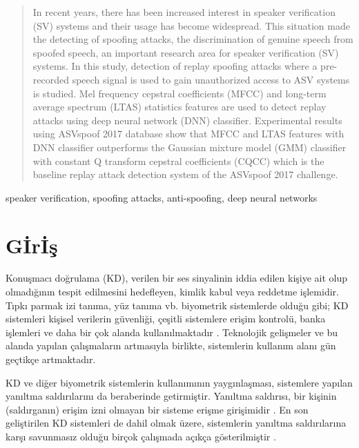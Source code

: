 \documentclass[conference, a4paper]{IEEEtran}
\begin{document}
\begin{abstract}
    In recent years, there has been increased interest in speaker verification (SV) systems and their usage has become
    widespread. This situation made the detecting of spoofing attacks, the discrimination of genuine speech from
    spoofed speech, an important research area for speaker verification (SV) systems. In this study, detection of
    replay spoofing attacks where a pre-recorded speech signal is used to gain unauthorized access to ASV systems is
    studied. Mel frequency cepstral coefficients (MFCC) and long-term average spectrum (LTAS) statistics features are
    used to detect replay attacks using deep neural network (DNN) classifier. Experimental results using ASVspoof 2017
    database show that MFCC and LTAS features with DNN classifier outperforms the Gaussian mixture model (GMM)
    classifier with constant Q transform cepstral coefficients (CQCC) which is the baseline replay attack detection
    system of the ASVspoof 2017 challenge.
\end{abstract}

\begin{IEEEkeywords}
    speaker verification, spoofing attacks, anti-spoofing, deep neural networks
\end{IEEEkeywords}

\IEEEpeerreviewmaketitle

\IEEEpubidadjcol

\section{G{\footnotesize İ}r{\footnotesize İ}ş}
Konuşmacı doğrulama (KD)\cite{kinnunen2010overview}, verilen bir ses sinyalinin iddia edilen kişiye ait
olup olmadığının tespit edilmesini hedefleyen, kimlik kabul veya reddetme işlemidir. Tıpkı parmak izi tanıma, yüz
tanıma vb. biyometrik sistemlerde olduğu gibi; KD sistemleri kişisel verilerin güvenliği, çeşitli sistemlere erişim
kontrolü, banka işlemleri ve daha bir çok alanda kullanılmaktadır \cite{hadid2015biometrics}. Teknolojik gelişmeler ve
bu alanda yapılan çalışmaların artmasıyla birlikte, sistemlerin kullanım alanı gün geçtikçe artmaktadır.

KD ve diğer biyometrik sistemlerin kullanımının yaygınlaşması, sistemlere yapılan yanıltma saldırılarını da beraberinde
getirmiştir. Yanıltma saldırısı, bir kişinin (saldırganın) erişim izni olmayan bir sisteme erişme girişimidir
\cite{hadid2015biometrics}. En son geliştirilen KD sistemleri de dahil olmak üzere, sistemlerin yanıltma saldırılarına
karşı savunmasız olduğu birçok çalışmada açıkça gösterilmiştir \cite{wu2015spoofing}.
\end{document}
